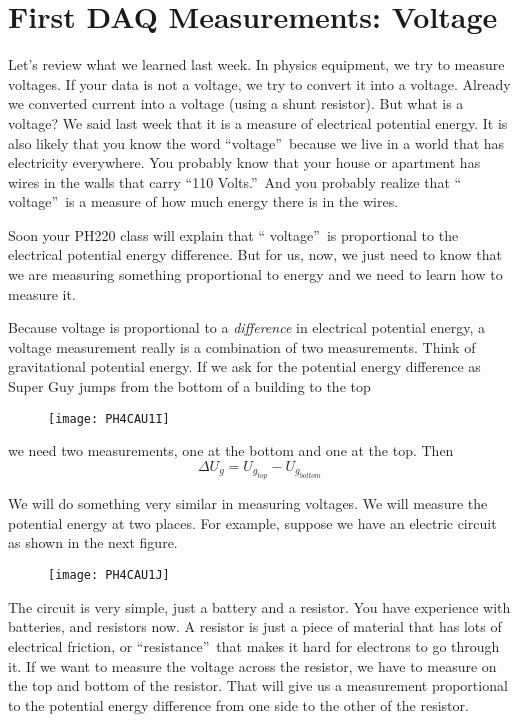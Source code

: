 \chapter{First DAQ Measurements: Voltage}
Let's review what we learned last week. In physics equipment, we try to
measure voltages. If your data is not a voltage, we try to convert it into a
voltage. Already we converted current into a voltage (using a shunt
resistor). But what is a voltage? We said last week that it is a measure of
electrical potential energy. It is also likely that you know the word
\textquotedblleft voltage\textquotedblright\ because we live in a world that
has electricity everywhere. You probably know that your house or apartment
has wires in the walls that carry \textquotedblleft 110
Volts.\textquotedblright\ And you probably realize that \textquotedblleft
voltage\textquotedblright\ is a measure of how much energy there is in the
wires.

Soon your PH220 class will explain that \textquotedblleft
voltage\textquotedblright\ is proportional to the electrical potential
energy difference. But for us, now, we just need to know that we are
measuring something proportional to energy and we need to learn how to
measure it.

Because voltage is proportional to a \emph{difference} in electrical
potential energy, a voltage measurement really is a combination of two
measurements. Think of gravitational potential energy. If we ask for the
potential energy difference as Super Guy jumps from the bottom of a building
to the top \begin{figure}[h!]
\texttt{[image: PH4CAU1I]}
\end{figure}we need two measurements, one at
the bottom and one at the top. Then 
\begin{equation*}
\Delta U_{g}=U_{g_{top}}-U_{g_{bottom}}
\end{equation*}

We will do something very similar in measuring voltages. We will measure the
potential energy at two places. For example, suppose we have an electric
circuit as shown in the next figure. \begin{figure}[h!]
\texttt{[image: PH4CAU1J]}
\end{figure}The circuit is very simple, just
a battery and a resistor. You have experience with batteries, and resistors
now. A resistor is just a piece of material that has lots of electrical
friction, or \textquotedblleft resistance\textquotedblright\ that makes it
hard for electrons to go through it. If we want to measure the voltage
across the resistor, we have to measure on the top and bottom of the
resistor. That will give us a measurement proportional to the potential
energy difference from one side to the other of the resistor.

